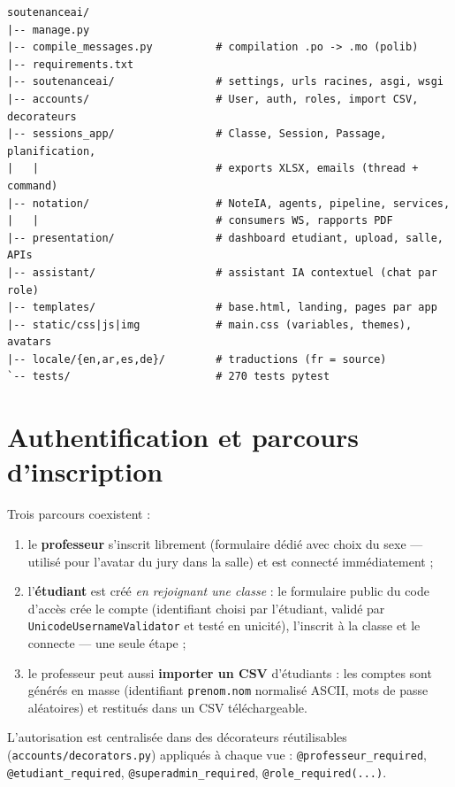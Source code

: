 \documentclass[12pt,a4paper]{report}
\begin{document}
\begin{lstlisting}[caption={Arborescence du projet (simplifiée)}]
soutenanceai/
|-- manage.py
|-- compile_messages.py          # compilation .po -> .mo (polib)
|-- requirements.txt
|-- soutenanceai/                # settings, urls racines, asgi, wsgi
|-- accounts/                    # User, auth, roles, import CSV, decorateurs
|-- sessions_app/                # Classe, Session, Passage, planification,
|   |                            # exports XLSX, emails (thread + command)
|-- notation/                    # NoteIA, agents, pipeline, services,
|   |                            # consumers WS, rapports PDF
|-- presentation/                # dashboard etudiant, upload, salle, APIs
|-- assistant/                   # assistant IA contextuel (chat par role)
|-- templates/                   # base.html, landing, pages par app
|-- static/css|js|img            # main.css (variables, themes), avatars
|-- locale/{en,ar,es,de}/        # traductions (fr = source)
`-- tests/                       # 270 tests pytest
\end{lstlisting}

\section{Authentification et parcours d'inscription}

Trois parcours coexistent :
\begin{enumerate}
  \item le \textbf{professeur} s'inscrit librement (formulaire dédié avec
        choix du sexe --- utilisé pour l'avatar du jury dans la salle) et est
        connecté immédiatement ;
  \item l'\textbf{étudiant} est créé \emph{en rejoignant une classe} : le
        formulaire public du code d'accès crée le compte (identifiant choisi
        par l'étudiant, validé par \texttt{UnicodeUsernameValidator} et testé
        en unicité), l'inscrit à la classe et le connecte --- une seule étape ;
  \item le professeur peut aussi \textbf{importer un CSV} d'étudiants : les
        comptes sont générés en masse (identifiant \texttt{prenom.nom}
        normalisé ASCII, mots de passe aléatoires) et restitués dans un CSV
        téléchargeable.
\end{enumerate}

L'autorisation est centralisée dans des décorateurs réutilisables
(\texttt{accounts/decorators.py}) appliqués à chaque vue :
\texttt{@professeur\_required}, \texttt{@etudiant\_required},
\texttt{@superadmin\_required}, \texttt{@role\_required(...)}.
\end{document}
